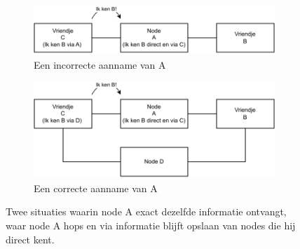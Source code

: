 \begin{figure}[ht]
    \centering
    \begin{subfigure}[][4cm][t]{0.8\textwidth}
        \centering
        \includegraphics[scale=1]{img/incorrectAssumption.pdf}
        \caption{Een incorrecte aanname van A}
        \label{fig:incorrectAssumption}
    \end{subfigure}
    \hfill
    \begin{subfigure}{0.8\textwidth}
        \centering
        \includegraphics[scale=1]{img/correctAssumption.pdf}
        \caption{Een correcte aanname van A}
        \label{fig:correctAssumption}
    \end{subfigure}
    \caption{Twee situaties waarin node A exact dezelfde informatie ontvangt, waar node A hops en via informatie blijft opslaan van nodes die hij direct kent.}
    \label{fig:HopsOpslaanVanActieveNode}
\end{figure}